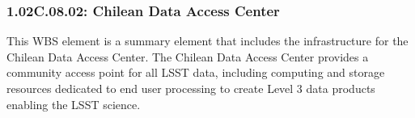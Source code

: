 \subsubsection*{1.02C.08.02: Chilean Data Access Center}

This WBS element is a summary element that includes the infrastructure for the
Chilean Data Access Center. The Chilean Data Access Center provides a
community access point for all LSST data, including computing and storage
resources dedicated to end user processing to create Level 3 data products
enabling the LSST science.
